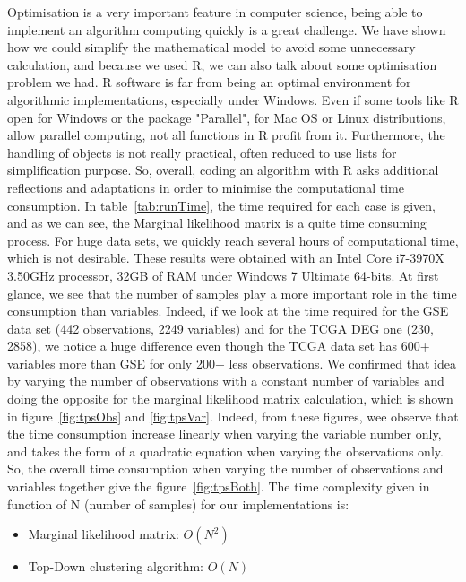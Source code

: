 \documentclass[twocolumn]{article}
\begin{document}
Optimisation is a very important feature in computer science, being able to implement an algorithm computing quickly is a great challenge.
We have shown how we could simplify the mathematical model to avoid some unnecessary calculation, and because we used R, we can also talk about some optimisation problem we had.
R software is far from being an optimal environment for algorithmic implementations, especially under Windows. Even if some tools like R open for Windows or the package "Parallel", for Mac OS or Linux distributions, allow parallel computing, not all functions in R profit from it.
Furthermore, the handling of objects is not really practical, often reduced to use lists for simplification purpose.
So, overall, coding an algorithm with R asks additional reflections and adaptations in order to minimise the computational time consumption.
In table~\ref{tab:runTime}, the time required for each case is given, and as we can see, the Marginal likelihood matrix is a quite time consuming process.
For huge data sets, we quickly reach several hours of computational time, which is not desirable.
These results were obtained with an Intel Core i7-3970X 3.50GHz processor, 32GB of RAM under Windows 7 Ultimate 64-bits.
At first glance, we see that the number of samples play a more important role in the time consumption than variables.
Indeed, if we look at the time required for the GSE data set (442 observations, 2249 variables) and for the TCGA DEG one (230, 2858), we notice a huge difference even though the TCGA data set has 600+ variables more than GSE for only 200+ less observations.
We confirmed that idea by varying the number of observations with a constant number of variables and doing the opposite for the marginal likelihood matrix calculation, which is shown in figure~\ref{fig:tpsObs} and \ref{fig:tpsVar}.
Indeed, from these figures, wee observe that the time consumption increase linearly when varying the variable number only, and takes the form of a quadratic equation when varying the observations only.
So, the overall time consumption when varying the number of observations and variables together give the figure~\ref{fig:tpsBoth}.
The time complexity given in function of N (number of samples) for our implementations is:
\begin{itemize}
    \item Marginal likelihood matrix: $O(N^2)$
    \item Top-Down clustering algorithm: $O(N)$
\end{itemize}
\end{document}
